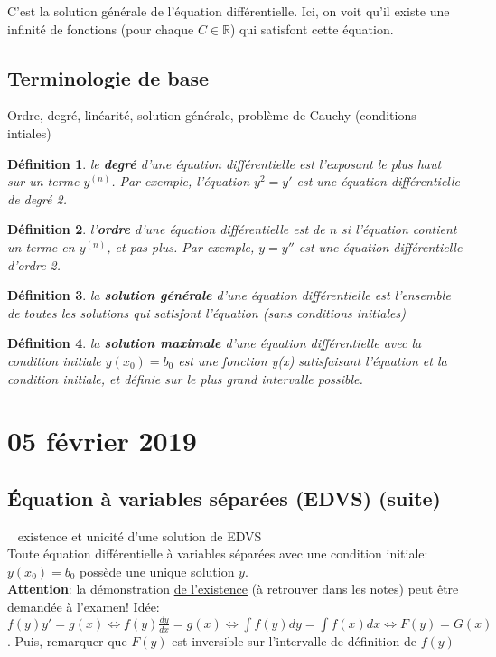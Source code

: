 \documentclass{report}
\newtheorem{defn}{Définition}
\newcommand\important[1]{\noindent \quad {\large \underline{\textsc{#1}}} \ }
\begin{document}
C'est la solution générale de l'équation différentielle. Ici, on voit qu'il existe une infinité de fonctions (pour chaque $C \in \mathbb{R}$) qui satisfont cette équation.

\subsection{Terminologie de base} %
Ordre, degré, linéarité, solution générale, problème de Cauchy (conditions intiales) \\
\begin{defn} le \textbf{degré} d'une équation différentielle est l'exposant le plus haut sur un terme $y^{(n)}$. Par exemple, l'équation $y^2 = y'$ est une équation différentielle de degré 2. 
\end{defn}
\begin{defn} l'\textbf{ordre} d'une équation différentielle est de $n$ si l'équation contient un terme en $y^{(n)}$, et pas plus. Par exemple, $y = y''$ est une équation différentielle d'ordre 2.
\end{defn}
\begin{defn} la \textbf{solution générale} d'une équation différentielle est l'ensemble de toutes les solutions qui satisfont l'équation (sans conditions initiales)
\end{defn}
\begin{defn} la \textbf{solution maximale} d'une équation différentielle avec la condition initiale $y(x_0) = b_0$ est une fonction y(x) satisfaisant l'équation et la condition initiale, et définie sur le plus grand intervalle possible.
\end{defn}

\section{05 février 2019}

\subsection{Équation à variables séparées (EDVS) (suite)}
\important{Théorème} existence et unicité d'une solution de EDVS \\
Toute équation différentielle à variables séparées avec une condition initiale: $y(x_0) = b_0$ possède une unique solution $y$. \\
\textbf{Attention}: la démonstration \underline{de l'existence} (à retrouver dans les notes) peut être demandée à l'examen! Idée: $f(y)y' = g(x) \iff f(y)\frac{dy}{dx} = g(x) \iff \int f(y)dy = \int f(x)dx \iff F(y) = G(x)$. Puis, remarquer que $F(y)$ est inversible sur l'intervalle de définition de $f(y)$ \\
\end{document}
